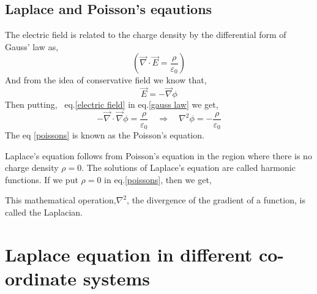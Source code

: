 \subsection{Laplace and Poisson's eqautions}
The electric field is related to the charge density by the  differential form of Gauss' law as,
\begin{equation}
\left(\vec{\nabla} \cdot \vec{E}=\frac{\rho}{\varepsilon_{0}}\right)\label{gauss law}
\end{equation}
And from the idea of conservative field we know that,\begin{equation}
\vec{E}=-\vec{\nabla} \phi\label{electric field}
\end{equation} 
Then putting, \ eq.\ref{electric field} in eq.\ref{gauss law} we get,
\begin{equation}
-\vec{\nabla} \cdot \vec{\nabla} \phi=\frac{\rho}{\varepsilon_{0}}\quad \Longrightarrow \quad \nabla^{2} \phi=-\frac{\rho}{\varepsilon_{0}}\label{poissons} 
\end{equation}
The eq \ref{poissons} is known as the Poisson's equation. 

\begin{center}
\end{center}
Laplace's equation follows from Poisson's equation in the region where there is no charge density $\rho=0 .$ The solutions of Laplace's equation are called harmonic functions. If we put $\rho=0$ in eq.\ref{poissons},  then we get,
\begin{center}
\end{center}
\begin{note}
This mathematical operation,$ \nabla^{2}$, the divergence of the gradient of a function, is called the Laplacian.
\end{note}
\section{Laplace equation in different co-ordinate systems}
